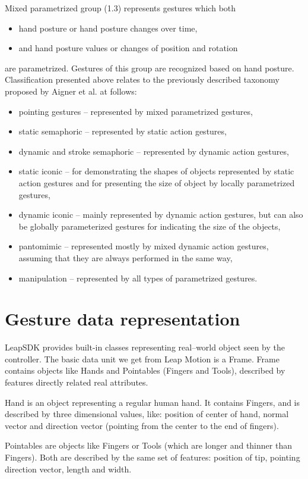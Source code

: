 Mixed parametrized group (1.3) represents gestures which both
\begin{itemize}
\item hand posture or hand posture changes over time,
\item and hand posture values or changes of position and rotation
\end{itemize}
are parametrized. Gestures of this group are recognized based on hand posture.
Classification presented above relates to the previously described taxonomy proposed by Aigner et al. at follows:
\begin{itemize}
\item pointing gestures -- represented by mixed parametrized gestures,
\item static semaphoric -- represented by static action gestures,
\item dynamic and stroke semaphoric -- represented by dynamic action gestures,
\item static iconic -- for demonstrating the shapes of objects represented by static action gestures and for presenting the size of object by locally parametrized gestures,
\item dynamic iconic -- mainly represented by dynamic action gestures, but can also be globally parameterized gestures for indicating the size of the objects,
\item pantomimic -- represented mostly by mixed dynamic action gestures, assuming that they are always performed in the same way,
\item manipulation -- represented by all types of parametrized gestures.
\end{itemize}

\section{Gesture data representation}

LeapSDK provides built-in classes representing real--world object seen by the controller. The basic data unit we get from Leap Motion is a Frame. Frame contains objects like Hands and Pointables (Fingers and Tools), described by features directly related real attributes.

Hand is an object representing a regular human hand. It contains Fingers, and is described by three dimensional values, like: position of center of hand, normal vector and direction vector (pointing from the center to the end of fingers). 

Pointables are objects like Fingers or Tools (which are longer and thinner than Fingers). Both are described by the same set of features: position of tip, pointing direction vector, length and width.

